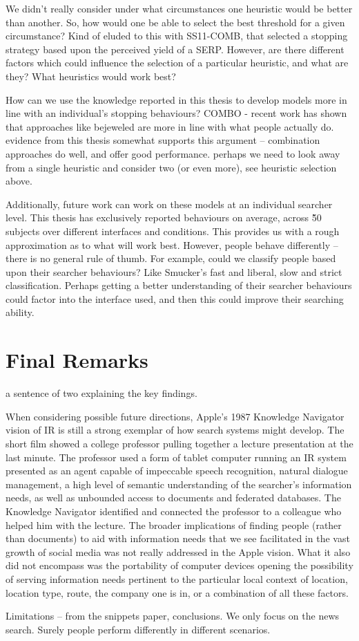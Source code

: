 We didn't really consider under what circumstances one heuristic would be better than another. So, how would one be able to select the best threshold for a given circumstance? Kind of eluded to this with SS11-COMB, that selected a stopping strategy based upon the perceived yield of a SERP. However, are there different factors which could influence the selection of a particular heuristic, and what are they? What heuristics would work best?

How can we use the knowledge reported in this thesis to develop models more in line with an individual's stopping behaviours?
COMBO - recent work has shown that approaches like bejeweled are more in line with what people actually do. evidence from this thesis somewhat supports this argument -- combination approaches do well, and offer good performance. perhaps we need to look away from a single heuristic and consider two (or even more), see heuristic selection above.

Additionally, future work can work on these models at an individual searcher level. This thesis has exclusively reported behaviours on average, across \~50 subjects over different interfaces and conditions. This provides us with a rough approximation as to what will work best. However, people behave differently -- there is no general rule of thumb. For example, could we classify people based upon their searcher behaviours? Like Smucker's fast and liberal, slow and strict classification. Perhaps getting a better understanding of their searcher behaviours could factor into the interface used, and then this could improve their searching ability.



\section{Final Remarks}
a sentence of two explaining the key findings.



When considering possible future directions, Apple’s 1987 Knowledge Navigator vision of IR is still a strong exemplar of how search systems might develop. The short film showed a college professor pulling together a lecture presentation at the last minute. The professor used a form of tablet computer running an IR system presented as an agent capable of impeccable speech recognition, natural dialogue management, a high level of semantic understanding of the searcher’s information needs, as well as unbounded access to documents and federated databases.
The Knowledge Navigator identified and connected the professor to a colleague who helped him with the lecture. The broader implications of finding people (rather than documents) to aid with information needs that we see facilitated in the vast growth of social media was not really addressed in the Apple vision. What it also did not encompass was the portability of computer devices opening the possibility of serving information needs pertinent to the particular local context of location, location type, route, the company one is in, or a combination of all these factors. 



Limitations -- from the snippets paper, conclusions. We only focus on the news search. Surely people perform differently in different scenarios.